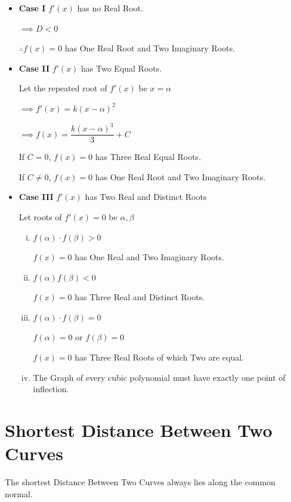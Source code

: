 \documentclass{article}
\begin{document}
\begin{itemize}
    \item \textbf{Case I} $f'(x)$ has no Real Root.

    $\implies D<0$ 
    
    $\therefore f(x)=0$ has One Real Root and Two Imaginary Roots.
    \item \textbf{Case II} $f'(x)$ has Two Equal Roots.

    Let the repeated root of $f'(x)$ be $x=\alpha$

    $\implies f'(x)=k\left(x-\alpha\right)^2$

    $\implies f(x)=\dfrac{k\left(x-\alpha\right)^3}{3}+C$

    If $C=0$, $f(x)=0$ has Three Real Equal Roots.

    If $C \not= 0$, $f(x)=0$ has One Real Root and Two Imaginary Roots.
    \item \textbf{Case III} $f'(x)$ has Two Real and Distinct Roots

    Let roots of $f'(x)=0$ be $\alpha, \beta$
    \begin{enumerate}[i.]
        \item $f(\alpha)\cdot f(\beta)>0$

        $f(x)=0$ has One Real and Two Imaginary Roots.

        \item $f(\alpha)f(\beta)<0$

        $f(x)=0$ has Three Real and Distinct Roots.

        \item $f(\alpha)\cdot f(\beta)=0$

        $f(\alpha)=0$ or $f(\beta)=0$

        $f(x)=0$ has Three Real Roots of which Two are equal.

        \item The Graph of every cubic polynomial must have exactly one point of inflection.
    \end{enumerate}
\end{itemize}

\section{Shortest Distance Between Two Curves}
The shortest Distance Between Two Curves always lies along the common normal.
\end{document}

